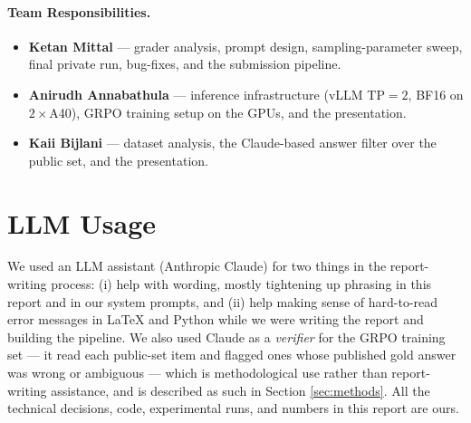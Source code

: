 \documentclass{article}
\begin{document}
\paragraph{Team Responsibilities.}
\begin{itemize}
    \item \textbf{Ketan Mittal} --- grader analysis, prompt
    design, sampling-parameter sweep, final private run,
    bug-fixes, and the submission pipeline.
    \item \textbf{Anirudh Annabathula} --- inference
    infrastructure (vLLM TP$=2$, BF16 on $2\times$A40), GRPO
    training setup on the GPUs, and the presentation.
    \item \textbf{Kaii Bijlani} --- dataset analysis, the
    Claude-based answer filter over the public set, and the
    presentation.
\end{itemize}


\section*{LLM Usage}
We used an LLM assistant (Anthropic Claude) for two things in the
report-writing process: (i) help with wording, mostly tightening
up phrasing in this report and in our system prompts, and
(ii) help making sense of hard-to-read error messages in LaTeX
and Python while we were writing the report and building the
pipeline. We also used Claude as a \emph{verifier} for the GRPO
training set --- it read each public-set item and flagged ones
whose published gold answer was wrong or ambiguous --- which is
methodological use rather than report-writing assistance, and is
described as such in Section \ref{sec:methods}. All the technical
decisions, code, experimental runs, and numbers in this report
are ours.




\end{document}
